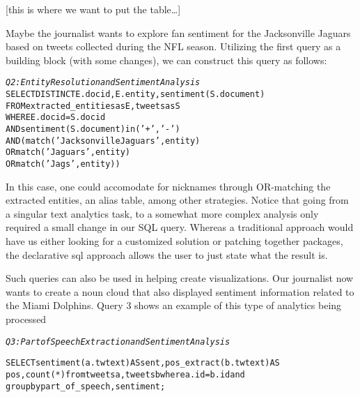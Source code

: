 [this is where we want to put the table\ldots]

Maybe the journalist wants to explore fan sentiment for the Jacksonville Jaguars
based on tweets collected during the NFL season. Utilizing the first 
query as a building block (with some changes), we can construct this 
query as follows:

\begin{small}
\begin{alltt}
\textit{Q2: Entity Resolution and Sentiment Analysis}
SELECT DISTINCT E.docid, E.entity, sentiment(S.document)
FROM extracted_entities as E, tweets as S
WHERE E.docid = S.docid
  AND sentiment(S.document) in ('+', '-')
  AND (match('Jacksonville Jaguars', entity)
       OR match('Jaguars', entity)
       OR match('Jags', entity))
\end{alltt}
\end{small}

In this case, one could accomodate for nicknames through OR-matching
the extracted entities, an alias table, among other strategies. Notice
that going from a singular text analytics task, to a somewhat more 
complex analysis only required a small change in our SQL query. 
Whereas a traditional approach would have us either looking for a
customized solution or patching together packages, the declarative
sql approach allows the user to just state what the result is.

Such queries can also be used in helping create visualizations. Our 
journalist now wants to create a noun cloud that also displayed sentiment
information related to the Miami Dolphins. Query 3 shows an example of this 
type of analytics being processed

\begin{small}
\begin{alltt}
\textit{Q3: Part of Speech Extraction and Sentiment Analysis}

SELECT sentiment(a.twtext) AS sent, pos_extract(b.twtext) AS
pos, count(*) from tweets a, tweets b where a.id = b.id and
group by part_of_speech, sentiment;
\end{alltt}
\end{small}



